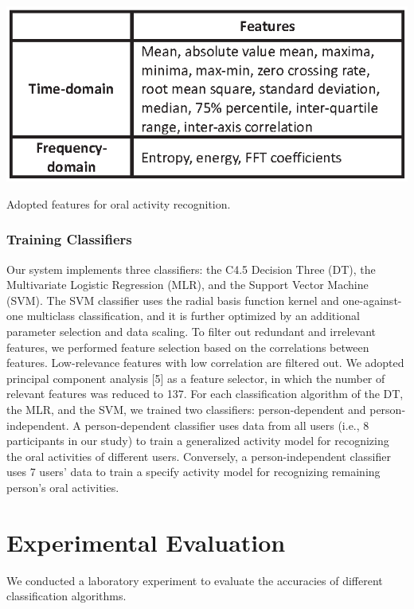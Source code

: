 \begin{table}[!ht]
\centering
\includegraphics[width=14cm]{image/teeth_table1}
\caption{Adopted features for oral activity recognition.}
\label{teeth_features}
\end{table}

\subsubsection{Training Classifiers}
Our system implements three classifiers: the C4.5 Decision Three (DT), the Multivariate Logistic Regression (MLR), and the Support Vector Machine (SVM). The SVM classifier uses the radial basis function kernel and one-against-one multiclass classification, and it is further optimized by an additional parameter selection and data scaling. To filter out redundant and irrelevant features, we performed feature selection based on the correlations between features. Low-relevance features with low correlation are filtered out. We adopted principal component analysis [5] as a feature selector, in which the number of relevant features was reduced to 137. 
For each classification algorithm of the DT, the MLR, and the SVM, we trained two classifiers: person-dependent and person-independent. A person-dependent classifier uses data from all users (i.e., 8 participants in our study) to train a generalized activity model for recognizing the oral activities of different users. Conversely, a person-independent classifier uses 7 users' data to train a specify activity model for recognizing remaining person's oral activities.

\section{Experimental Evaluation}
We conducted a laboratory experiment to evaluate the accuracies of different classification algorithms.

